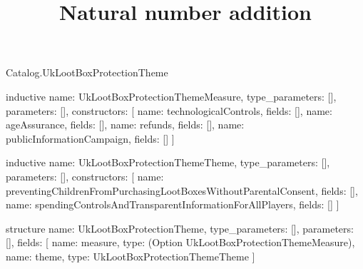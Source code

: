 \begin{lexlean}{Catalog.UkLootBoxProtectionTheme}
\title{Natural number addition}
\begin{semanticmodule}
inductive{
  name: UkLootBoxProtectionThemeMeasure,
  type_parameters: [],
  parameters: [],
  constructors: [
    {name: technologicalControls, fields: []},
    {name: ageAssurance, fields: []},
    {name: refunds, fields: []},
    {name: publicInformationCampaign, fields: []}
  ]
}

inductive{
  name: UkLootBoxProtectionThemeTheme,
  type_parameters: [],
  parameters: [],
  constructors: [
    {name: preventingChildrenFromPurchasingLootBoxesWithoutParentalConsent, fields: []},
    {name: spendingControlsAndTransparentInformationForAllPlayers, fields: []}
  ]
}

structure{
  name: UkLootBoxProtectionTheme,
  type_parameters: [],
  parameters: [],
  fields: [
    {name: measure, type: (Option UkLootBoxProtectionThemeMeasure)},
    {name: theme, type: UkLootBoxProtectionThemeTheme}
  ]
}
\end{semanticmodule}
\end{lexlean}
